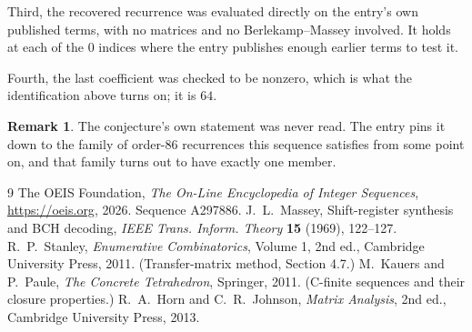 \documentclass[11pt,a4paper]{article}
\theoremstyle{plain}
\theoremstyle{definition}
\newtheorem{remark}[theorem]{Remark}
\begin{document}
Third, the recovered recurrence was evaluated directly on the entry's own published terms, with
no matrices and no Berlekamp--Massey involved. It holds at each of the $0$ indices where
the entry publishes enough earlier terms to test it.

Fourth, the last coefficient was checked to be nonzero, which is what the identification above
turns on; it is $64$.

\begin{remark}
The conjecture's own statement was never read. The entry pins it down to the family of
order-$86$ recurrences this sequence satisfies from some point on, and that family turns
out to have exactly one member.
\end{remark}

\begin{thebibliography}{9}
 The OEIS Foundation, \emph{The On-Line Encyclopedia of Integer
Sequences}, \url{https://oeis.org}, 2026. Sequence A297886.
 J.~L.~Massey, Shift-register synthesis and BCH decoding, \emph{IEEE
Trans. Inform. Theory} \textbf{15} (1969), 122--127.
 R.~P.~Stanley, \emph{Enumerative Combinatorics}, Volume 1, 2nd ed.,
Cambridge University Press, 2011. (Transfer-matrix method, Section 4.7.)
 M.~Kauers and P.~Paule, \emph{The Concrete Tetrahedron}, Springer, 2011.
(C-finite sequences and their closure properties.)
 R.~A.~Horn and C.~R.~Johnson, \emph{Matrix Analysis}, 2nd ed., Cambridge
University Press, 2013.
\end{thebibliography}
\end{document}
